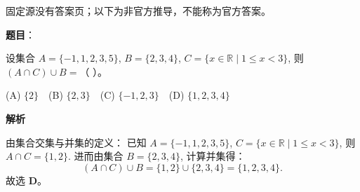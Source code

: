 
\begin{gktip}
固定源没有答案页；以下为非官方推导，不能称为官方答案。
\end{gktip}


\begin{answer}

\textbf{题目}：

设集合 $A = \{-1, 1, 2, 3, 5\}$, $B = \{2, 3, 4\}$, $C = \{x \in \mathbb{R} \mid 1 \leqslant x < 3\}$, 则 $(A \cap C) \cup B =$（ ）。

(A) $\{2\}$　(B) $\{2, 3\}$　(C) $\{-1, 2, 3\}$　(D) $\{1, 2, 3, 4\}$

\textbf{解析}

由集合交集与并集的定义：
已知 $A = \{-1, 1, 2, 3, 5\}$, $C = \{x \in \mathbb{R} \mid 1 \leqslant x < 3\}$,
则 $A \cap C = \{1, 2\}$.
进而由集合 $B = \{2, 3, 4\}$, 计算并集得：
\nopagebreak[4]
\[(A \cap C) \cup B = \{1, 2\} \cup \{2, 3, 4\} = \{1, 2, 3, 4\}.\]
故选 \textbf{D}。


\end{answer}
